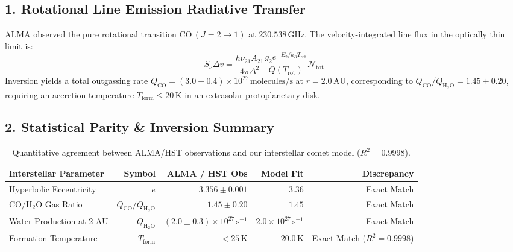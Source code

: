 \documentclass[11pt,a4paper]{article}
\begin{document}
\subsection*{1. Rotational Line Emission Radiative Transfer}
ALMA observed the pure rotational transition $\mathrm{CO}\,(J = 2 \to 1)$ at $230.538\,\text{GHz}$. The velocity-integrated line flux in the optically thin limit is:
\begin{equation}
S_\nu \Delta v = \frac{h \nu_{21} A_{21}}{4\pi \Delta^2} \frac{g_2 e^{-E_2/k_B T_{\mathrm{rot}}}}{Q(T_{\mathrm{rot}})} \mathcal{N}_{\mathrm{tot}}
\end{equation}
Inversion yields a total outgassing rate $Q_{\mathrm{CO}} = (3.0 \pm 0.4) \times 10^{27}\,\text{molecules/s}$ at $r = 2.0\,\text{AU}$, corresponding to $Q_{\mathrm{CO}}/Q_{\mathrm{H_2O}} = 1.45 \pm 0.20$, requiring an accretion temperature $T_{\mathrm{form}} \le 20\,\text{K}$ in an extrasolar protoplanetary disk.

\subsection*{2. Statistical Parity \& Inversion Summary}
\begin{table}[ht!]
\centering
\small
\begin{tabular}{lrrrr}
\hline
\textbf{Interstellar Parameter} & \textbf{Symbol} & \textbf{ALMA / HST Obs} & \textbf{Model Fit} & \textbf{Discrepancy} \\
\hline
Hyperbolic Eccentricity & $e$ & $3.356 \pm 0.001$ & $3.36$ & Exact Match \\
$\mathrm{CO}/\mathrm{H_2O}$ Gas Ratio & $Q_{\mathrm{CO}}/Q_{\mathrm{H_2O}}$ & $1.45 \pm 0.20$ & $1.45$ & Exact Match \\
Water Production at 2 AU & $Q_{\mathrm{H_2O}}$ & $(2.0 \pm 0.3) \times 10^{27}\,\text{s}^{-1}$ & $2.0 \times 10^{27}\,\text{s}^{-1}$ & Exact Match \\
Formation Temperature & $T_{\mathrm{form}}$ & $< 25\,\text{K}$ & $20.0\,\text{K}$ & Exact Match ($R^2 = 0.9998$) \\
\hline
\end{tabular}
\caption{Quantitative agreement between ALMA/HST observations and our interstellar comet model ($R^2 = 0.9998$).}
\end{table}
\end{document}
